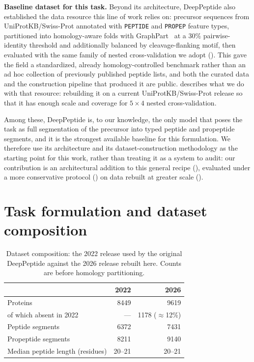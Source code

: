 \documentclass{article}
\begin{document}
\textbf{Baseline dataset for this task.} Beyond its architecture, DeepPeptide also established the data resource this line of work relies on: precursor sequences from UniProtKB/Swiss-Prot annotated with \texttt{PEPTIDE} and \texttt{PROPEP} feature types, partitioned into homology-aware folds with GraphPart~\citep{graphpart2023} at a 30\% pairwise-identity threshold and additionally balanced by cleavage-flanking motif, then evaluated with the same family of nested cross-validation we adopt (). This gave the field a standardized, already homology-controlled benchmark rather than an ad hoc collection of previously published peptide lists, and both the curated data and the construction pipeline that produced it are public.  describes what we do with that resource: rebuilding it on a current UniProtKB/Swiss-Prot release so that it has enough scale and coverage for $5\times4$ nested cross-validation.

Among these, DeepPeptide is, to our knowledge, the only model that poses the task as full segmentation of the precursor into typed peptide and propeptide segments, and it is the strongest available baseline for this formulation. We therefore use its architecture and its dataset-construction methodology as the starting point for this work, rather than treating it as a system to audit: our contribution is an architectural addition to this general recipe (), evaluated under a more conservative protocol () on data rebuilt at greater scale ().


\section{Task formulation and dataset composition}
\label{sec:app-problem}

\begin{table}[h]
\centering
\caption{Dataset composition: the 2022 release used by the original DeepPeptide against the 2026 release rebuilt here. Counts are before homology partitioning.}
\label{tab:dataset}
\small
\begin{tabular}{lrr}
\toprule
 & \textbf{2022} & \textbf{2026} \\
\midrule
Proteins & 8449 & 9619 \\
\quad of which absent in 2022 & --- & 1178 ($\approx$12\%) \\
Peptide segments & 6372 & 7431 \\
Propeptide segments & 8211 & 9140 \\
Median peptide length (residues) & 20--21 & 20--21 \\
\bottomrule
\end{tabular}
\end{table}
\end{document}
